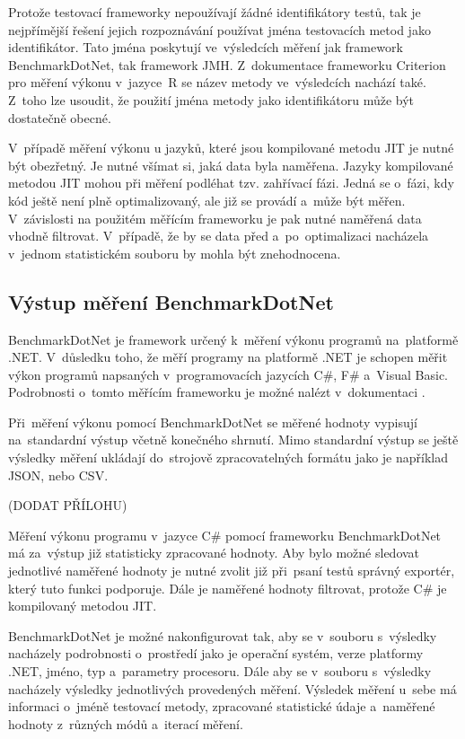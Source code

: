 Protože testovací frameworky nepoužívají žádné identifikátory testů, tak je nejpřímější
řešení jejich rozpoznávání používat jména testovacích metod jako identifikátor. Tato jména poskytují ve~výsledcích
měření jak framework BenchmarkDotNet, tak framework JMH. Z~dokumentace frameworku Criterion \cite[]{criterion}
pro měření výkonu v~jazyce~R se název metody ve~výsledcích nachází také. Z~toho lze
usoudit, že použití jména metody jako identifikátoru může být dostatečně obecné.

V~případě měření výkonu u jazyků, které jsou kompilované metodu JIT je nutné být obezřetný. Je nutné
všímat si, jaká data byla naměřena. Jazyky kompilované metodou JIT mohou při měření podléhat tzv. zahřívací
fázi. Jedná se o~fázi, kdy kód ještě není plně optimalizovaný, ale již se provádí a~může být měřen.
V~závislosti na použitém měřícím frameworku je pak nutné naměřená data vhodně filtrovat. V~případě, že
by se data před a~po~optimalizaci nacházela v~jednom statistickém souboru by mohla být znehodnocena.

\subsection{Výstup měření BenchmarkDotNet}

BenchmarkDotNet je framework určený k~měření výkonu programů na~platformě .NET. V~důsledku
toho, že měří programy na platformě .NET je schopen měřit výkon programů napsaných
v~programovacích jazycích C\#, F\# a~Visual Basic. Podrobnosti o~tomto měřícím frameworku
je možné nalézt v~dokumentaci \cite[]{benchmarkDotNet}.

Při~měření výkonu pomocí BenchmarkDotNet se měřené hodnoty vypisují na~standardní výstup
včetně konečného shrnutí. Mimo standardní výstup se ještě výsledky měření ukládají
do~strojově zpracovatelných formátu jako je například JSON, nebo CSV.

(DODAT PŘÍLOHU)

Měření výkonu programu v~jazyce C\# pomocí frameworku BenchmarkDotNet má za~výstup již statisticky zpracované hodnoty.
Aby bylo možné sledovat jednotlivé naměřené hodnoty je nutné zvolit již při~psaní testů správný
exportér, který tuto funkci podporuje. Dále je naměřené hodnoty filtrovat, protože C\# je kompilovaný
metodou JIT.

BenchmarkDotNet je možné nakonfigurovat tak, aby se v~souboru s~výsledky nacházely podrobnosti o~prostředí jako je operační systém,
verze platformy .NET, jméno, typ a~parametry procesoru. Dále aby se v~souboru s~výsledky nacházely
výsledky jednotlivých provedených měření. Výsledek měření u~sebe má informaci o~jméně
testovací metody, zpracované statistické údaje a~naměřené hodnoty z~různých módů a~iterací měření.

